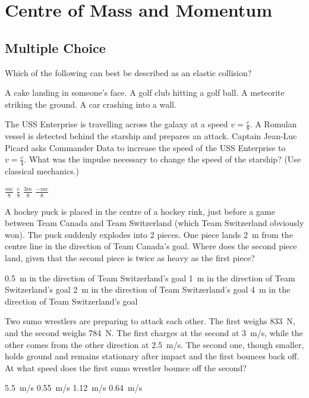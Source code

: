 \section{Centre of Mass and Momentum}

\subsection{Multiple Choice}

\question Which of the following can best be described as an elastic collision?
\begin{checkboxes} 
	\choice A cake landing in someone's face.
	\CorrectChoice A golf club hitting a golf ball.
	\choice A meteorite striking the ground.
	\choice A car crashing into a wall.
\end{checkboxes}

\question The USS Enterprise is travelling across the galaxy at a speed $v = \frac{c}{8}$. A Romulan vessel is detected behind the starship and prepares an attack. Captain Jean-Luc Picard asks Commander Data to increase the speed of the USS Enterprise to $v = \frac{c}{4}$. What was the impulse necessary to change the speed of the starship? (Use classical mechanics.)
\begin{checkboxes}
\CorrectChoice $\frac{mc}{8}$ \correct
\choice $\frac{c}{8}$
\choice $\frac{3m}{8}$
\choice  $\frac{-mc}{8}$
\end{checkboxes}

\question A hockey puck is placed in the centre of a hockey rink, just before a game between Team Canada and Team Switzerland (which Team Switzerland obviously won). The puck suddenly explodes into 2 pieces. One piece lands \SI{2}{m} from the centre line in the direction of Team Canada's goal. Where does the second piece land, given that the second piece is twice as heavy as the first piece?
\begin{checkboxes} 
	\choice \SI{0.5}{m} in the direction of Team Switzerland's goal
	\CorrectChoice \SI{1}{m} in the direction of Team Switzerland's goal
	\choice \SI{2}{m} in the direction of Team Switzerland's goal
	\choice \SI{4}{m} in the direction of Team Switzerland's goal
\end{checkboxes}

\question Two sumo wrestlers are preparing to attack each other.  The first weighs \SI{833}{N}, and the second weighs \SI{784}{N}. The first charges at the second at \SI{3}{m/s}, while the other comes from the other direction at \SI{2.5}{m/s}.  The second one, though smaller, holds ground and remains stationary after impact and the first bounces back off.  At what speed does the first sumo wrestler bounce off the second?
\begin{checkboxes}
\choice \SI{5.5}{m/s} 
\choice \SI{0.55}{m/s}
\choice \SI{1.12}{m/s}
\CorrectChoice \SI{0.64}{m/s} \correct
\end{checkboxes}


